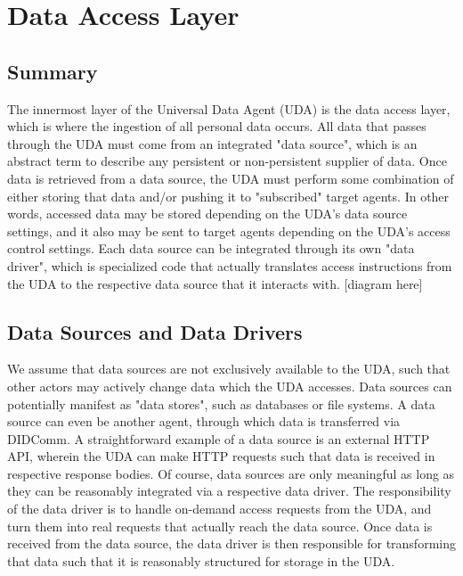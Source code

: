 \section{Data Access Layer}

\subsection{Summary}
The innermost layer of the Universal Data Agent (UDA) is the data access layer, which is where the ingestion of all personal data occurs. All data that passes through the UDA must come from an integrated "data source", which is an abstract term to describe any persistent or non-persistent supplier of data. Once data is retrieved from a data source, the UDA must perform some combination of either storing that data and/or pushing it to "subscribed" target agents. In other words, accessed data may be stored depending on the UDA's data source settings, and it also may be sent to target agents depending on the UDA's access control settings. Each data source can be integrated through its own "data driver", which is specialized code that actually translates access instructions from the UDA to the respective data source that it interacts with.
[diagram here]

\subsection{Data Sources and Data Drivers}
We assume that data sources are not exclusively available to the UDA, such that other actors may actively change data which the UDA accesses. Data sources can potentially manifest as "data stores", such as databases or file systems. A data source can even be another agent, through which data is transferred via DIDComm. A straightforward example of a data source is an external HTTP API, wherein the UDA can make HTTP requests such that data is received in respective response bodies.
Of course, data sources are only meaningful as long as they can be reasonably integrated via a respective data driver. The responsibility of the data driver is to handle on-demand access requests from the UDA, and turn them into real requests that actually reach the data source. Once data is received from the data source, the data driver is then responsible for transforming that data such that it is reasonably structured for storage in the UDA.

